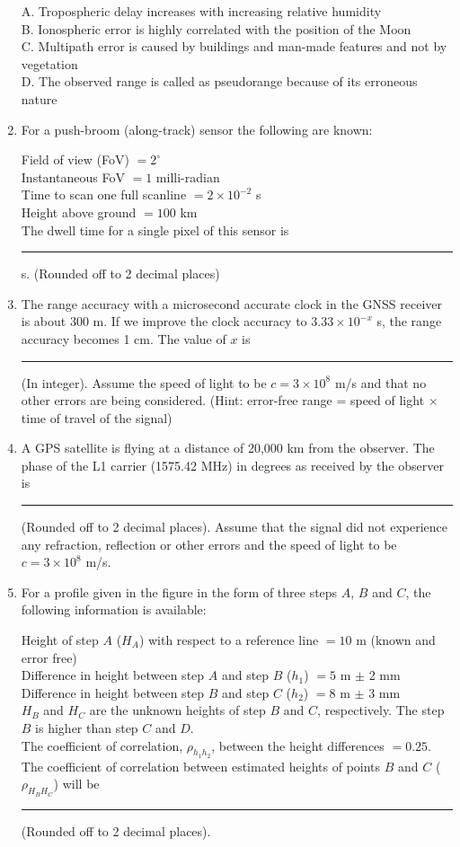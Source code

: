 \documentclass[journal,12pt,onecolumn]{IEEEtran}
\begin{document}
\begin{enumerate}
    A. Tropospheric delay increases with increasing relative humidity \\
    B. Ionospheric error is highly correlated with the position of the Moon \\
    C. Multipath error is caused by buildings and man-made features and not by vegetation \\
    D. The observed range is called as pseudorange because of its erroneous nature

    \item For a push-broom (along-track) sensor the following are known:

    Field of view (FoV) $= 2^\circ$ \\
    Instantaneous FoV $= 1$ milli-radian \\
    Time to scan one full scanline $= 2 \times 10^{-2}$ s \\
    Height above ground $= 100$ km \\
    The dwell time for a single pixel of this sensor is \rule{3cm}{0.15mm} s. (Rounded off to 2 decimal places)

    \item The range accuracy with a microsecond accurate clock in the GNSS receiver is about 300 m. If we improve the clock accuracy to $3.33 \times 10^{-x}$ s, the range accuracy becomes 1 cm. The value of $x$ is \rule{3cm}{0.15mm} (In integer). Assume the speed of light to be $c=3 \times 10^8$ m/s and that no other errors are being considered. (Hint: error-free range = speed of light $\times$ time of travel of the signal)

    \item A GPS satellite is flying at a distance of 20,000 km from the observer. The phase of the L1 carrier (1575.42 MHz) in degrees as received by the observer is \rule{3cm}{0.15mm} (Rounded off to 2 decimal places). Assume that the signal did not experience any refraction, reflection or other errors and the speed of light to be $c=3 \times 10^8$ m/s.

    \item For a profile given in the figure in the form of three steps $A$, $B$ and $C$, the following information is available:

    Height of step $A$ ($H_A$) with respect to a reference line $= 10$ m (known and error free) \\
    Difference in height between step $A$ and step $B$ ($h_1$) $= 5$ m $\pm$ 2 mm \\
    Difference in height between step $B$ and step $C$ ($h_2$) $= 8$ m $\pm$ 3 mm \\
    $H_B$ and $H_C$ are the unknown heights of step $B$ and $C$, respectively. The step $B$ is higher than step $C$ and $D$. \\
    The coefficient of correlation, $\rho_{h_1 h_2}$, between the height differences $= 0.25$. \\
    The coefficient of correlation between estimated heights of points $B$ and $C$ ($\rho_{H_B H_C}$) will be \rule{3cm}{0.15mm} (Rounded off to 2 decimal places).


\end{enumerate}
\end{document}
